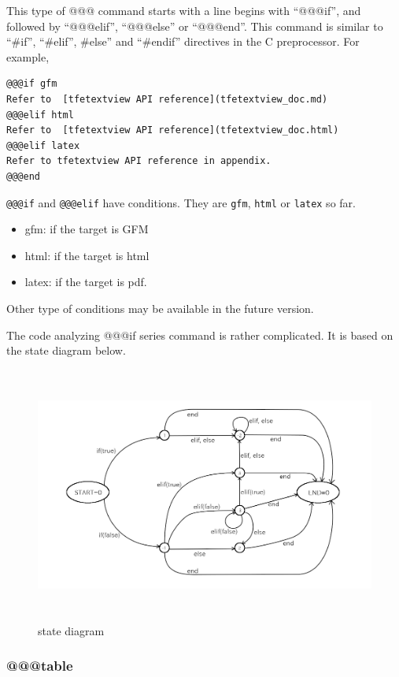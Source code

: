 This type of @@@ command starts with a line begins with ``@@@if'', and
followed by ``@@@elif'', ``@@@else'' or ``@@@end''. This command is
similar to ``\#if'', ``\#elif'', \#else'' and ``\#endif'' directives in
the C preprocessor. For example,

\begin{verbatim}
@@@if gfm
Refer to  [tfetextview API reference](tfetextview_doc.md)
@@@elif html
Refer to  [tfetextview API reference](tfetextview_doc.html)
@@@elif latex
Refer to tfetextview API reference in appendix.
@@@end
\end{verbatim}

\texttt{@@@if} and \texttt{@@@elif} have conditions. They are
\texttt{gfm}, \texttt{html} or \texttt{latex} so far.

\begin{itemize}
\tightlist
\item
  gfm: if the target is GFM
\item
  html: if the target is html
\item
  latex: if the target is pdf.
\end{itemize}

Other type of conditions may be available in the future version.

The code analyzing @@@if series command is rather complicated. It is
based on the state diagram below.

\begin{figure}
\centering
\includegraphics[width=15cm,height=8.4cm]{../image/state_diagram.png}
\caption{state diagram}
\end{figure}

\subsubsection{@@@table}\label{table}


